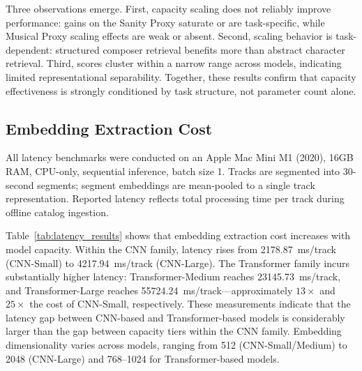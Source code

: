 \documentclass{article}
\begin{document}
Three observations emerge. First, capacity scaling does not reliably improve performance: gains on the Sanity Proxy saturate or are task-specific, while Musical Proxy scaling effects are weak or absent. Second, scaling behavior is task-dependent: structured composer retrieval benefits more than abstract character retrieval. Third, scores cluster within a narrow range across models, indicating limited representational separability. Together, these results confirm that capacity effectiveness is strongly conditioned by task structure, not parameter count alone.

\subsection{Embedding Extraction Cost}

All latency benchmarks were conducted on an Apple Mac Mini M1 (2020), 16GB RAM, CPU-only, sequential inference, batch size 1. Tracks are segmented into 30-second segments; segment embeddings are mean-pooled to a single track representation. Reported latency reflects total processing time per track during offline catalog ingestion.

\begin{table}[!htbp]
\centering
\caption{Embedding extraction cost, model size, and embedding dimensionality across model capacities. Parameter counts for CNN-based models are obtained from \cite{kong2020panns}, while Transformer parameter counts are based on publicly available pretrained checkpoints.}
\label{tab:latency_results}
\end{table}

Table~\ref{tab:latency_results} shows that embedding extraction cost increases with model capacity. Within the CNN family, latency rises from 2178.87~ms/track (CNN-Small) to 4217.94~ms/track (CNN-Large). The Transformer family incurs substantially higher latency: Transformer-Medium reaches 23145.73~ms/track, and Transformer-Large reaches 55724.24~ms/track---approximately $13\times$ and $25\times$ the cost of CNN-Small, respectively. These measurements indicate that the latency gap between CNN-based and Transformer-based models is considerably larger than the gap between capacity tiers within the CNN family. Embedding dimensionality varies across models, ranging from 512 (CNN-Small/Medium) to 2048 (CNN-Large) and 768--1024 for Transformer-based models.
\end{document}
